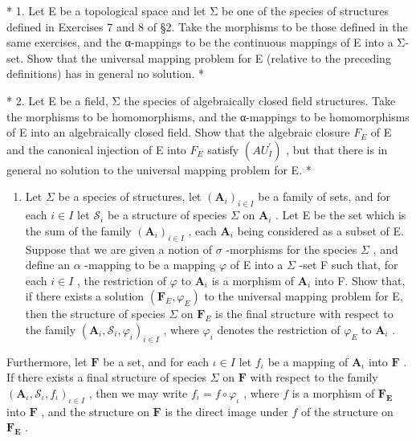 \exercisegroup

* 1. Let E be a topological space and let Σ be one of the species of structures defined in Exercises 7 and 8 of §2. Take the morphisms to be those defined in the same exercises, and the α-mappings to be the continuous mappings of E into a Σ-set. Show that the universal mapping problem for E (relative to the preceding definitions) has in general no solution. *

* 2. Let E be a field, Σ the species of algebraically closed field structures. Take the morphisms to be homomorphisms, and the α-mappings to be homomorphisms of E into an algebraically closed field. Show that the algebraic closure \(F_{E}\) of E and the canonical injection of E into \(F_{E}\) satisfy \((AU_{I}^{\prime})\) , but that there is in general no solution to the universal mapping problem for E. *

\begin{enumerate}
\def\labelenumi{\arabic{enumi}.}
\setcounter{enumi}{2}
\tightlist
\item
  Let \(\Sigma\) be a species of structures, let \((\mathbf{A}_i)_{i \in I}\) be a family of sets, and for each \(i \in I\) let \(\mathcal{S}_i\) be a structure of species \(\Sigma\) on \(\mathbf{A}_i\) . Let E be the set which is the sum of the family \((\mathbf{A}_i)_{i \in I}\) , each \(\mathbf{A}_i\) being considered as a subset of E. Suppose that we are given a notion of \(\sigma\) -morphisms for the species \(\Sigma\) , and define an \(\alpha\) -mapping to be a mapping \(\varphi\) of E into a \(\Sigma\) -set F such that, for each \(i \in I\) , the restriction of \(\varphi\) to \(\mathbf{A}_i\) is a morphism of \(\mathbf{A}_i\) into F. Show that, if there exists a solution \((\mathbf{F}_E, \varphi_E)\) to the universal mapping problem for E, then the structure of species \(\Sigma\) on \(\mathbf{F}_E\) is the final structure with respect to the family \((\mathbf{A}_i, \mathcal{S}_i, \varphi_i)_{i \in I}\) , where \(\varphi_i\) denotes the restriction of \(\varphi_E\) to \(\mathbf{A}_i\) .
\end{enumerate}

Furthermore, let \(\mathbf{F}\) be a set, and for each \(\iota \in I\) let \(f_{\iota}\) be a mapping of \(\mathbf{A}_{\iota}\) into \(\mathbf{F}\) . If there exists a final structure of species \(\Sigma\) on \(\mathbf{F}\) with respect to the family \((\mathbf{A}_{\iota}, \mathcal{S}_{\iota}, f_{\iota})_{\iota \in I}\) , then we may write \(f_{\iota} = f \circ \varphi_{\iota}\) , where \(f\) is a morphism of \(\mathbf{F}_{\mathbf{E}}\) into \(\mathbf{F}\) , and the structure on \(\mathbf{F}\) is the direct image under \(f\) of the structure on \(\mathbf{F}_{\mathbf{E}}\) .

